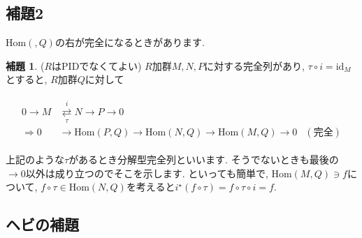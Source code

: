 \documentclass{jsarticle}
\def\Hom{\mathrm{Hom}}
\def\id{\mathrm{id}}
\theoremstyle{definition}
\newtheorem{lemma}{補題}
\numberwithin{theorem}{section}
\begin{document}
\subsection{補題2}
$\Hom(, Q)$の右が完全になるときがあります.

\newpage

\begin{lemma}
($R$はPIDでなくてよい) $R$加群$M, N, P$に対する完全列があり, $\tau\circ i = \id_M$とすると, $R$加群$Q$に対して

\begin{eqnarray*}
\begin{aligned}
0 \rightarrow M &\overset{i}{\underset{\tau}{\rightleftarrows}} N \rightarrow P \rightarrow 0\\
\Rightarrow 0 &\rightarrow \Hom(P, Q) \rightarrow \Hom(N, Q) \rightarrow \Hom(M, Q) \rightarrow 0 &(完全)
\end{aligned}
\end{eqnarray*}
\end{lemma}

上記のような$\tau$があるとき分解型完全列といいます. そうでないときも最後の$\rightarrow 0$以外は成り立つのでそこを示します.
といっても簡単で, $\Hom(M, Q) \ni f$について, $f\circ\tau \in \Hom(N, Q)$を考えると$i^\star(f\circ\tau) = f\circ\tau\circ i = f$.

\subsection{ヘビの補題}
\end{document}
